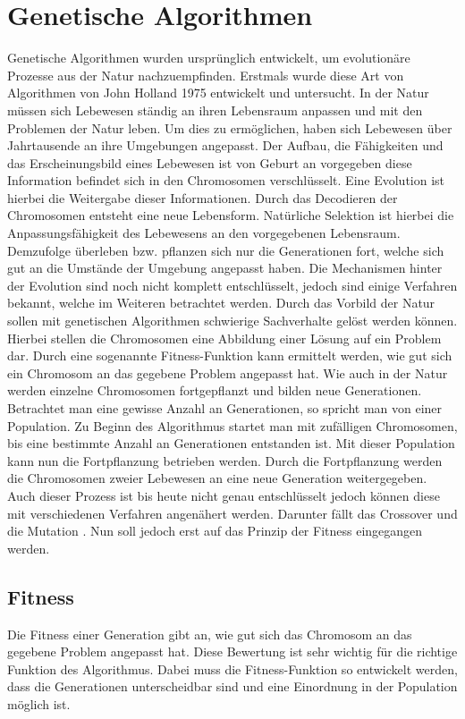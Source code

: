 \section{Genetische Algorithmen}
\label{sec:genetischer_algo}
Genetische Algorithmen wurden ursprünglich entwickelt, um evolutionäre Prozesse aus der Natur nachzuempfinden. Erstmals wurde diese Art von Algorithmen von John Holland 1975 entwickelt und untersucht.
In der Natur müssen sich Lebewesen ständig an ihren Lebensraum anpassen und mit den Problemen der Natur leben. Um dies zu ermöglichen, haben sich Lebewesen über Jahrtausende an ihre Umgebungen angepasst. Der Aufbau, die Fähigkeiten und das Erscheinungsbild eines Lebewesen ist von Geburt an vorgegeben diese Information befindet sich in den Chromosomen verschlüsselt. Eine Evolution ist hierbei die Weitergabe dieser Informationen. Durch das Decodieren der Chromosomen entsteht eine neue Lebensform.
Natürliche Selektion ist hierbei die Anpassungsfähigkeit des Lebewesens an den vorgegebenen Lebensraum. Demzufolge überleben bzw. pflanzen sich nur die Generationen fort, welche sich gut an die Umstände der Umgebung angepasst haben. Die Mechanismen hinter der Evolution sind noch nicht komplett entschlüsselt, jedoch sind einige Verfahren bekannt, welche im Weiteren betrachtet werden.
Durch das Vorbild der Natur sollen mit genetischen Algorithmen schwierige Sachverhalte gelöst werden können. Hierbei stellen die Chromosomen eine Abbildung einer Lösung auf ein Problem dar. Durch eine sogenannte Fitness-Funktion kann ermittelt werden, wie gut sich ein Chromosom an das gegebene Problem angepasst hat. Wie auch in der Natur werden einzelne Chromosomen fortgepflanzt und bilden neue Generationen. Betrachtet man eine gewisse Anzahl an Generationen, so spricht man von einer Population. Zu Beginn des Algorithmus startet man mit zufälligen Chromosomen, bis eine bestimmte Anzahl an Generationen entstanden ist. Mit dieser Population kann nun die Fortpflanzung betrieben werden.
Durch die Fortpflanzung werden die Chromosomen zweier Lebewesen an eine neue Generation weitergegeben. Auch dieser Prozess ist bis heute nicht genau entschlüsselt jedoch können diese mit verschiedenen Verfahren angenähert werden. Darunter fällt das Crossover und die Mutation \cite{davis1991handbook}. Nun soll jedoch erst auf das Prinzip der Fitness eingegangen werden. 

\subsection{Fitness}
Die Fitness einer Generation gibt an, wie gut sich das Chromosom an das gegebene Problem angepasst hat. Diese Bewertung ist sehr wichtig für die richtige Funktion des Algorithmus. Dabei muss die Fitness-Funktion so entwickelt werden, dass die Generationen unterscheidbar sind und eine Einordnung in der Population möglich ist.\cite{davis1991handbook}

